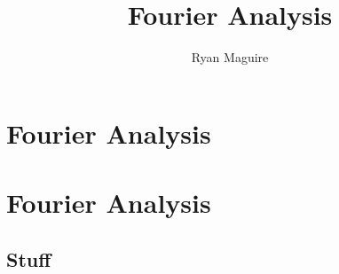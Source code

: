 \documentclass[crop=false,class=book,oneside]{standalone}
\begin{document}
    \ifx\ifmathcourses\undefined
        \title{Fourier Analysis}
        \author{Ryan Maguire}
        \date{\vspace{-5ex}}
        \maketitle
        \tableofcontents
        \clearpage
        \chapter*{Fourier Analysis}
        \vspace{10ex}
        \setcounter{chapter}{1}
    \else
        \chapter{Fourier Analysis}
    \fi
    \section{Stuff}
\end{document}
